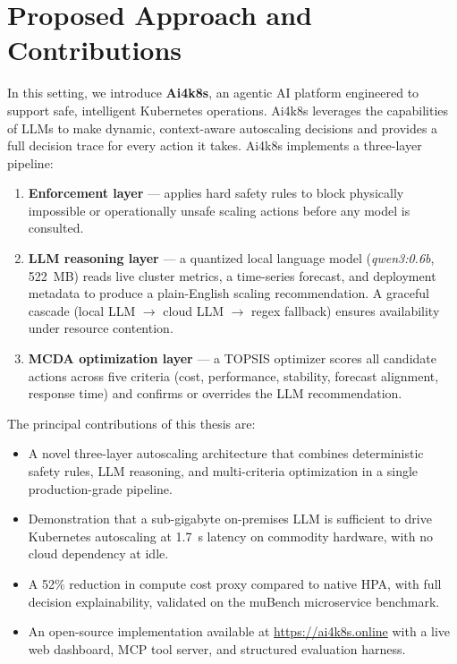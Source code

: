 \section{Proposed Approach and Contributions}
\label{sec:contributions}

In this setting, we introduce \textbf{Ai4k8s}, an agentic AI platform engineered to
support safe, intelligent Kubernetes operations. Ai4k8s leverages the capabilities
of \glspl{LLM} to make dynamic, context-aware autoscaling decisions and provides a
full decision trace for every action it takes. Ai4k8s implements a three-layer pipeline:

\begin{enumerate}
  \item \textbf{Enforcement layer} — applies hard safety rules to block physically
  impossible or operationally unsafe scaling actions before any model is consulted.

  \item \textbf{LLM reasoning layer} — a quantized local language model
  (\textit{qwen3:0.6b}, 522~MB) reads live cluster metrics, a time-series forecast,
  and deployment metadata to produce a plain-English scaling recommendation. A
  graceful cascade (local LLM $\to$ cloud LLM $\to$ regex fallback) ensures
  availability under resource contention.

  \item \textbf{\gls{MCDA} optimization layer} — a TOPSIS optimizer scores all
  candidate actions across five criteria (cost, performance, stability, forecast
  alignment, response time) and confirms or overrides the LLM recommendation.
\end{enumerate}

The principal contributions of this thesis are:

\begin{itemize}
  \item A novel three-layer autoscaling architecture that combines deterministic
  safety rules, \gls{LLM} reasoning, and multi-criteria optimization in a single
  production-grade pipeline.

  \item Demonstration that a sub-gigabyte on-premises LLM is sufficient to drive
  Kubernetes autoscaling at 1.7~s latency on commodity hardware, with no cloud
  dependency at idle.

  \item A 52\% reduction in compute cost proxy compared to native HPA, with full
  decision explainability, validated on the muBench microservice benchmark.

  \item An open-source implementation available at \url{https://ai4k8s.online} with
  a live web dashboard, MCP tool server, and structured evaluation harness.
\end{itemize}

